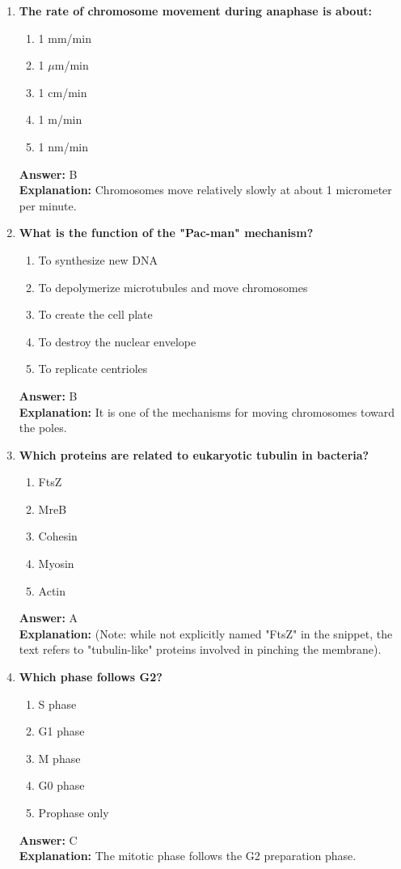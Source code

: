 \documentclass[11pt, a4paper]{article}
\begin{document}
\begin{enumerate}[leftmargin=*, label=\arabic*.]
\item \textbf{The rate of chromosome movement during anaphase is about:}
\begin{enumerate}[label=\Alph*.]
\item 1 mm/min
\item 1 $\mu$m/min
\item 1 cm/min
\item 1 m/min
\item 1 nm/min
\end{enumerate}
\textbf{Answer:} B \\
\textbf{Explanation:} Chromosomes move relatively slowly at about 1 micrometer per minute.

\item \textbf{What is the function of the "Pac-man" mechanism?}
\begin{enumerate}[label=\Alph*.]
\item To synthesize new DNA
\item To depolymerize microtubules and move chromosomes
\item To create the cell plate
\item To destroy the nuclear envelope
\item To replicate centrioles
\end{enumerate}
\textbf{Answer:} B \\
\textbf{Explanation:} It is one of the mechanisms for moving chromosomes toward the poles.

\item \textbf{Which proteins are related to eukaryotic tubulin in bacteria?}
\begin{enumerate}[label=\Alph*.]
\item FtsZ
\item MreB
\item Cohesin
\item Myosin
\item Actin
\end{enumerate}
\textbf{Answer:} A \\
\textbf{Explanation:} (Note: while not explicitly named "FtsZ" in the snippet, the text refers to "tubulin-like" proteins involved in pinching the membrane).

\item \textbf{Which phase follows G2?}
\begin{enumerate}[label=\Alph*.]
\item S phase
\item G1 phase
\item M phase
\item G0 phase
\item Prophase only
\end{enumerate}
\textbf{Answer:} C \\
\textbf{Explanation:} The mitotic phase follows the G2 preparation phase.


\end{enumerate}
\end{document}
